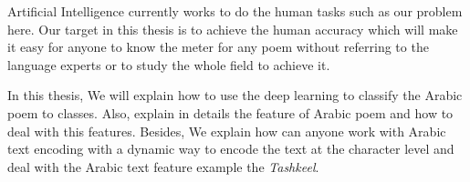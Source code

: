 Artificial Intelligence currently works to do the human tasks such as our problem here. Our target in this thesis is to achieve the human accuracy which will make it easy for anyone to know the meter for any poem without referring to the language experts or to study the whole field to achieve it.

In this thesis, We will explain how to use the deep learning to classify the Arabic poem to classes. Also, explain in details the feature of Arabic poem and how to deal with this features. Besides, We explain how can anyone work with Arabic text encoding with a dynamic way to encode the text at the character level and deal with the Arabic text feature example the  \textit{Tashkeel}.

